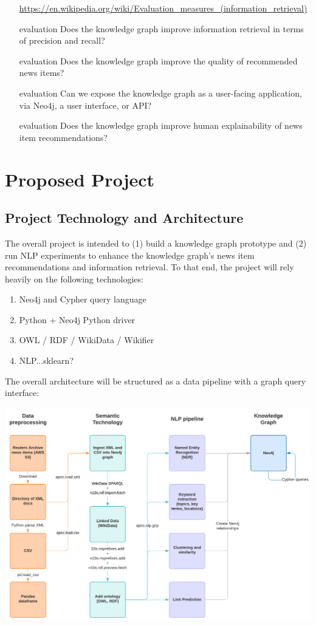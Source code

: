 \documentclass[11pt]{article}   	%
\begin{document}
\begin{itemize}
{\url{https://en.wikipedia.org/wiki/Evaluation_measures_(information_retrieval)}}
\item [evaluation] Does the knowledge graph improve information retrieval in terms of precision and recall?
\item [evaluation] Does the knowledge graph improve the quality of recommended news items?
\item [evaluation] Can we expose the knowledge graph as a user-facing application, via Neo4j, a user interface, or API?
\item [evaluation] Does the knowledge graph improve human explainability of news item recommendations?
\end{itemize}

\newpage
\section{Proposed Project}
\subsection{Project Technology and Architecture}
The overall project is intended to (1) build a knowledge graph prototype and (2) run NLP experiments to enhance the knowledge graph's news item recommendations and information retrieval. To that end, the project will rely heavily on the following technologies:
\begin{enumerate}
\item Neo4j and Cypher query language
\item Python + Neo4j Python driver
\item OWL / RDF / WikiData / Wikifier
\item NLP...sklearn?
\end{enumerate}

The overall architecture will be structured as a data pipeline with a graph query interface:

\includegraphics[scale=0.3]{data-pipeline}
\end{document}
